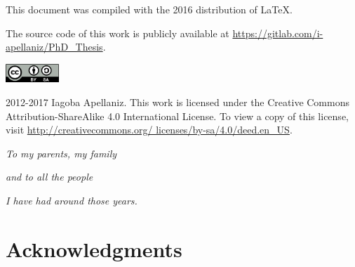 \documentclass[12pt, letterpaper, twoside]{article}
\numberwithin{equation}{section}
\numberwithin{figure}{section}
\numberwithin{table}{section}
\begin{document}
\renewcommand{\thefootnote}{\fnsymbol{footnote}}

\pagestyle{fancy}
\renewcommand{\headrulewidth}{0pt}
\fancyhead{}
\fancyfoot{}





\cleardoublepage

This document was compiled with the 2016 distribution of \LaTeX.

The source code of this work is publicly available at \url{https://gitlab.com/i-apellaniz/PhD_Thesis}.

\vfill

\includegraphics[height=20pt]{img/0-CreativeCommons-by-sa.png}

2012-2017 Iagoba Apellaniz. This work is licensed under the Creative Commons
Attribution-ShareAlike 4.0 International License. To view a copy of this
license, visit
\href{http://creativecommons.org/licenses/by-sa/4.0/deed.en_US}
{http://creativecommons.org/ licenses/by-sa/4.0/deed.en\_US}.
\clearpage






\cleardoublepage

\fancyfoot{}

\cleardoublepage
\setcounter{page}{1}

\vspace*{100pt}
\begin{center}
\emph{To my parents, my family}

\emph{and to all the people}

\emph{I have had around those years.}
\end{center}

\cleardoublepage

\fancyfoot[LE,RO]{\thepage}
\section*{Acknowledgments}
\end{document}
